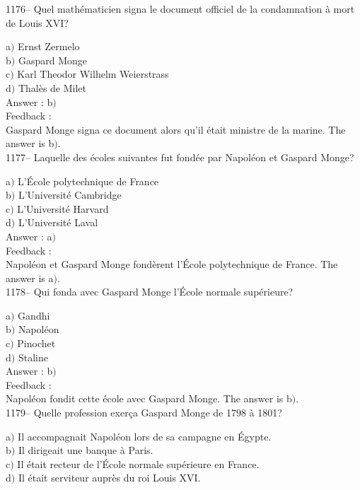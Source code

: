 ﻿\documentclass[letterpaper, 12pt]{article}
\begin{document}
1176-- Quel math\'ematicien signa le document officiel de la
condamnation \`a mort de Louis XVI?

a$)$ Ernst Zermelo \\
b$)$ Gaspard Monge \\
c$)$ Karl Theodor Wilhelm Weierstrass  \\
d$)$ Thal\`es de Milet\\

Answer : b$)$\\

Feedback : \\
Gaspard Monge signa ce document alors qu'il \'etait ministre de la
marine.
The answer is b$)$.\\

1177-- Laquelle des \'ecoles suivantes fut fond\'ee par Napol\'eon
et Gaspard Monge?

a$)$ L'\'Ecole polytechnique de France \\
b$)$ L'Universit\'e Cambridge \\
c$)$ L'Universit\'e Harvard \\
d$)$ L'Universit\'e Laval\\

Answer : a$)$\\

Feedback : \\
Napol\'eon et Gaspard Monge fond\`erent l'\'Ecole polytechnique de
France.
The answer is a$)$.\\

1178-- Qui fonda avec Gaspard Monge l'\'Ecole normale sup\'erieure?

a$)$ Gandhi \\
b$)$ Napol\'eon \\
c$)$ Pinochet \\
d$)$ Staline\\

Answer : b$)$\\

Feedback : \\
Napol\'eon fondit cette \'ecole avec Gaspard Monge.
The answer is b$)$.\\

1179-- Quelle profession exer\c ca Gaspard Monge de 1798 \`a 1801?

a$)$ Il accompagnait Napol\'eon lors de sa campagne en \'Egypte. \\
b$)$ Il dirigeait une banque \`a Paris. \\
c$)$ Il \'etait recteur de l'\'Ecole normale sup\'erieure en France. \\
d$)$ Il \'etait serviteur aupr\`es du roi Louis XVI. \\
\end{document}
